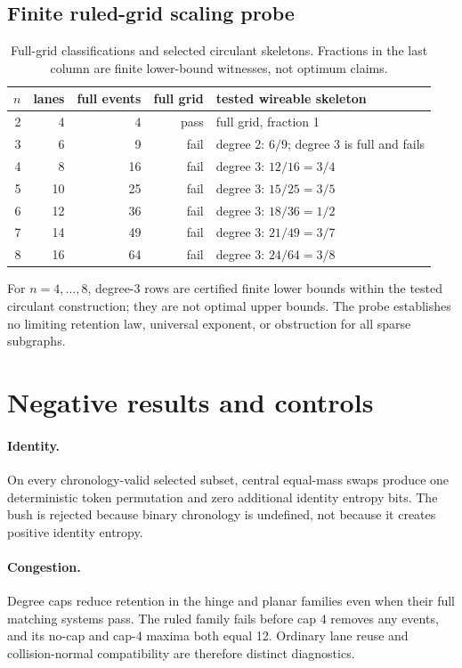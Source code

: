 \documentclass[11pt]{article}
\theoremstyle{definition}
\theoremstyle{remark}
\begin{document}
\subsection{Finite ruled-grid scaling probe}
\begin{table}[ht]
\centering\small
\caption{Full-grid classifications and selected circulant skeletons. Fractions in the last column are finite lower-bound witnesses, not optimum claims.}\label{tab:scaling}
\vspace{0.35em}
\begin{tabular}{@{}rrrrl@{}}
\toprule
$n$ & lanes & full events & full grid & tested wireable skeleton\\
\midrule
2 & 4 & 4 & pass & full grid, fraction 1\\
3 & 6 & 9 & fail & degree 2: $6/9$; degree 3 is full and fails\\
4 & 8 & 16 & fail & degree 3: $12/16=3/4$\\
5 & 10 & 25 & fail & degree 3: $15/25=3/5$\\
6 & 12 & 36 & fail & degree 3: $18/36=1/2$\\
7 & 14 & 49 & fail & degree 3: $21/49=3/7$\\
8 & 16 & 64 & fail & degree 3: $24/64=3/8$\\
\bottomrule
\end{tabular}
\end{table}

For $n=4,\ldots,8$, degree-3 rows are certified finite lower bounds within the tested circulant construction; they are not optimal upper bounds. The probe establishes no limiting retention law, universal exponent, or obstruction for all sparse subgraphs.

\section{Negative results and controls}

\paragraph{Identity.} On every chronology-valid selected subset, central equal-mass swaps produce one deterministic token permutation and zero additional identity entropy bits. The bush is rejected because binary chronology is undefined, not because it creates positive identity entropy.

\paragraph{Congestion.} Degree caps reduce retention in the hinge and planar families even when their full matching systems pass. The ruled family fails before cap 4 removes any events, and its no-cap and cap-4 maxima both equal 12. Ordinary lane reuse and collision-normal compatibility are therefore distinct diagnostics.
\end{document}
